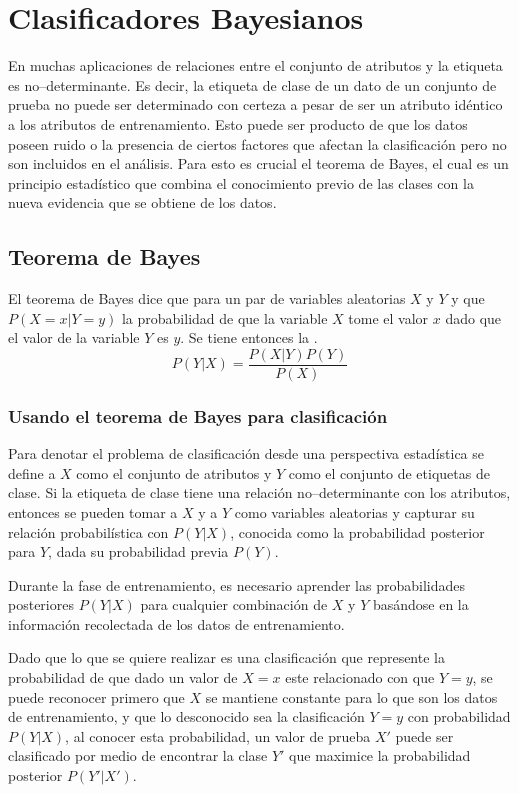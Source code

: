 \section{Clasificadores Bayesianos} \label{sec:bayes}
En muchas aplicaciones de relaciones entre el conjunto de atributos y la etiqueta es no--determinante. Es decir, la etiqueta de clase de un dato de un conjunto de prueba no puede ser determinado con certeza a pesar de ser un atributo idéntico a los atributos de entrenamiento. Esto puede ser producto de que los datos poseen ruido o la presencia de ciertos factores que afectan la clasificación pero no son incluidos en el análisis. Para esto es crucial el teorema de Bayes, el cual es un principio estadístico que combina el conocimiento previo de las clases con la nueva evidencia que se obtiene de los datos.

\subsection{Teorema de Bayes} \label{subsec:bayestheo}
El teorema de Bayes dice que para un par de variables aleatorias $X$ y $Y$ y que $P(X=x | Y=y)$ la probabilidad de que la variable $X$ tome el valor $x$ dado que el valor de la variable $Y$ es $y$. Se tiene entonces la .
\begin{equation} \label{eq:bayestheo}
  P(Y | X) = \frac{P(X | Y) P(Y)}{P(X)}
\end{equation}

\subsubsection{Usando el teorema de Bayes para clasificación}
Para denotar el problema de clasificación desde una perspectiva estadística se define a $X$ como el conjunto de atributos y $Y$ como el conjunto de etiquetas de clase. Si la etiqueta de clase tiene una relación no--determinante con los atributos, entonces se pueden tomar a $X$ y a $Y$ como variables aleatorias y capturar su relación probabilística con $P(Y|X)$, conocida como la probabilidad posterior para $Y$, dada su probabilidad previa $P(Y)$.

Durante la fase de entrenamiento, es necesario aprender las probabilidades posteriores $P(Y|X)$ para cualquier combinación de $X$ y $Y$ basándose en la información recolectada de los datos de entrenamiento.

Dado que lo que se quiere realizar es una clasificación que represente la probabilidad de que dado un valor de $X=x$ este relacionado con que $Y=y$, se puede reconocer primero que $X$ se mantiene constante para lo que son los datos de entrenamiento, y que lo desconocido sea la clasificación $Y=y$ con probabilidad $P(Y|X)$, al conocer esta probabilidad, un valor de prueba $X'$ puede ser clasificado por medio de encontrar la clase $Y'$ que maximice la probabilidad posterior $P(Y'|X')$.


